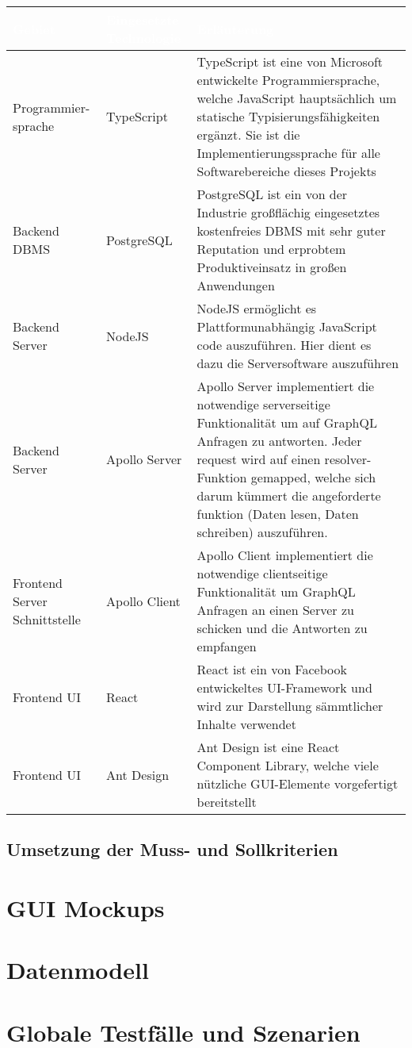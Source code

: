 \documentclass[a4paper,12pt]{article}
\begin{document}
\begin{center}
      \begin{tabular}{|m{3cm}|m{3cm}|m{9cm}|}
            \hline
        \rowcolor{TUMBlue} \textcolor{white}{\textbf{Gebiet}} & \textcolor{white}{\textbf{Eingesetzte Technologie}} & \textcolor{white}{\textbf{Erläuterung}} \\
        \hline
        Programmier- sprache & TypeScript & TypeScript ist eine von Microsoft entwickelte Programmiersprache, welche JavaScript hauptsächlich um statische Typisierungsfähigkeiten ergänzt. Sie ist die Implementierungssprache für alle Softwarebereiche dieses Projekts \\
        \hline
        Backend DBMS & PostgreSQL & PostgreSQL ist ein von der Industrie großflächig eingesetztes kostenfreies DBMS mit sehr guter Reputation und erprobtem Produktiveinsatz in großen Anwendungen \\
        \hline
        Backend Server & NodeJS & NodeJS ermöglicht es Plattformunabhängig JavaScript code auszuführen. Hier dient es dazu die Serversoftware auszuführen \\
        \hline
        Backend Server & Apollo Server & Apollo Server implementiert die notwendige serverseitige Funktionalität um auf GraphQL Anfragen zu antworten. Jeder request wird auf einen resolver-Funktion gemapped, welche sich darum kümmert die angeforderte funktion (Daten lesen, Daten schreiben) auszuführen. \\
        \hline
        Frontend Server Schnittstelle & Apollo Client & Apollo Client implementiert die notwendige clientseitige Funktionalität um GraphQL Anfragen an einen Server zu schicken und die Antworten zu empfangen \\
        \hline
        Frontend UI & React & React ist ein von Facebook entwickeltes UI-Framework und wird zur Darstellung sämmtlicher Inhalte verwendet \\
        \hline
        Frontend UI & Ant Design & Ant Design ist eine React Component Library, welche viele nützliche GUI-Elemente vorgefertigt bereitstellt \\
        \hline
      \end{tabular}
\end{center}

\subsection{Umsetzung der Muss- und Sollkriterien}

\section{GUI Mockups}

\section{Datenmodell}

\section{Globale Testfälle und Szenarien}

\clearpage

\end{document}

